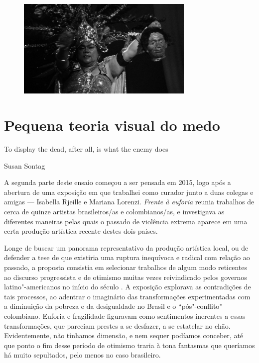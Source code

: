 \pagebreak
\thispagestyle{empty}

\begin{vplace}[.6]
\begin{figure}[!ht]
\centering
 \includegraphics[width=85mm]{./imgs/frame2.jpg}
\caption{\tiny{}}
\end{figure}
\end{vplace}

\pagebreak

\section*{Pequena teoria visual do medo}

\epigraph{To display the dead, after all, is what the enemy does}{Susan Sontag}

A segunda parte deste ensaio começou a ser pensada em 2015, logo após a
abertura de uma exposição em que trabalhei como curador junto a duas
colegas e amigas --- Isabella Rjeille e Mariana Lorenzi. \emph{Frente à
euforia} reunia trabalhos de cerca de quinze artistas brasileiros/as e
colombianos/as, e investigava as diferentes maneiras pelas
quais o passado de violência extrema aparece em uma certa produção artística
recente destes dois países.

Longe de buscar um panorama representativo da produção artística local,
ou de defender a tese de que existiria uma ruptura inequívoca e radical
com relação ao passado, a proposta consistia em selecionar trabalhos de
algum modo reticentes ao discurso progressista e de otimismo muitas
vezes reivindicado pelos governos latino"-americanos no início do século
. A exposição explorava as contradições de tais processos, ao adentrar
o imaginário das transformações experimentadas com a diminuição da
pobreza e da desigualdade no Brasil e o ``pós"-conflito'' colombiano.
Euforia e fragilidade figuravam como sentimentos inerentes a essas
transformações, que pareciam prestes a se desfazer, a se estatelar no
chão. Evidentemente, não tínhamos dimensão, e nem sequer podíamos
conceber, até que ponto o fim desse período de otimismo traria à tona
fantasmas que queríamos há muito sepultados, pelo menos no caso
brasileiro.

